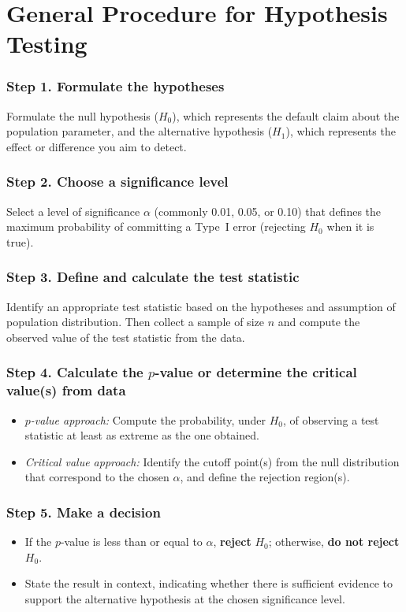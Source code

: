 \documentclass[twoside]{book}
\begin{document}

\section{General Procedure for Hypothesis Testing}


	\subsubsection*{Step 1. Formulate the hypotheses}
	Formulate the {null hypothesis} ($H_0$), which represents the default claim about the population parameter, and the {alternative hypothesis} ($H_1$), which represents the effect or difference you aim to detect.

	\subsubsection*{Step 2. Choose a significance level}
	Select a level of significance $\alpha$ (commonly 0.01, 0.05, or 0.10) that defines the maximum probability of committing a Type I error (rejecting $H_0$ when it is true).

	\subsubsection*{Step 3. Define and calculate the test statistic}
	Identify an appropriate test statistic based on the hypotheses and assumption of population distribution. Then collect a sample of size $n$ and compute the observed value of the test statistic from the data.

	\subsubsection*{Step 4. Calculate the $ p $­-value or determine the critical value(s) from data}
	\begin{itemize}
		\item \emph{$ p $­-value approach:} Compute the probability, under $H_0$, of observing a test statistic at least as extreme as the one obtained.
		\item \emph{Critical value approach:} Identify the cutoff point(s) from the null distribution that correspond to the chosen $\alpha$, and define the rejection region(s).
	\end{itemize}

	\subsubsection*{Step 5. Make a decision}
	\begin{itemize}
		\item If the $ p $­-value is less than or equal to $\alpha$, \textbf{reject} $H_0$; otherwise, \textbf{do not reject} $H_0$.
		\item State the result in context, indicating whether there is sufficient evidence to support the alternative hypothesis at the chosen significance level.
	\end{itemize}
\end{document}
